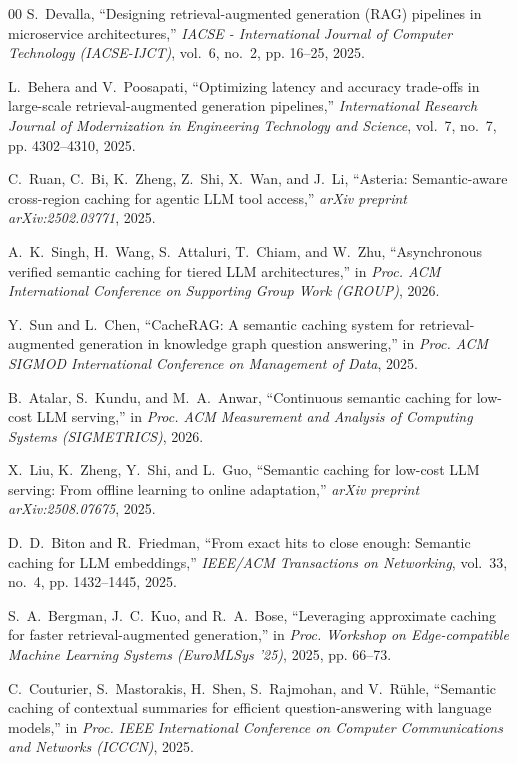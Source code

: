 \documentclass{ieeeaccess}
\begin{document}
\begin{thebibliography}{00}
S.~Devalla, 
``Designing retrieval-augmented generation (RAG) pipelines in microservice architectures,'' 
\emph{IACSE - International Journal of Computer Technology (IACSE-IJCT)}, vol.~6, no.~2, pp. 16--25, 2025.

L.~Behera and V.~Poosapati, 
``Optimizing latency and accuracy trade-offs in large-scale retrieval-augmented generation pipelines,'' 
\emph{International Research Journal of Modernization in Engineering Technology and Science}, vol.~7, no.~7, pp. 4302--4310, 2025.

C.~Ruan, C.~Bi, K.~Zheng, Z.~Shi, X.~Wan, and J.~Li, 
``Asteria: Semantic-aware cross-region caching for agentic LLM tool access,'' 
\emph{arXiv preprint arXiv:2502.03771}, 2025.

A.~K.~Singh, H.~Wang, S.~Attaluri, T.~Chiam, and W.~Zhu, 
``Asynchronous verified semantic caching for tiered LLM architectures,'' 
in \emph{Proc. ACM International Conference on Supporting Group Work (GROUP)}, 2026.

Y.~Sun and L.~Chen, 
``CacheRAG: A semantic caching system for retrieval-augmented generation in knowledge graph question answering,'' 
in \emph{Proc. ACM SIGMOD International Conference on Management of Data}, 2025.

B.~Atalar, S.~Kundu, and M.~A.~Anwar, 
``Continuous semantic caching for low-cost LLM serving,'' 
in \emph{Proc. ACM Measurement and Analysis of Computing Systems (SIGMETRICS)}, 2026.

X.~Liu, K.~Zheng, Y.~Shi, and L.~Guo, 
``Semantic caching for low-cost LLM serving: From offline learning to online adaptation,'' 
\emph{arXiv preprint arXiv:2508.07675}, 2025.

D.~D.~Biton and R.~Friedman, 
``From exact hits to close enough: Semantic caching for LLM embeddings,'' 
\emph{IEEE/ACM Transactions on Networking}, vol.~33, no.~4, pp. 1432--1445, 2025.

S.~A.~Bergman, J.~C.~Kuo, and R.~A.~Bose, 
``Leveraging approximate caching for faster retrieval-augmented generation,'' 
in \emph{Proc. Workshop on Edge-compatible Machine Learning Systems (EuroMLSys '25)}, 2025, pp. 66--73.

C.~Couturier, S.~Mastorakis, H.~Shen, S.~Rajmohan, and V.~Rühle, 
``Semantic caching of contextual summaries for efficient question-answering with language models,'' 
in \emph{Proc. IEEE International Conference on Computer Communications and Networks (ICCCN)}, 2025.


\end{thebibliography}
\end{document}
